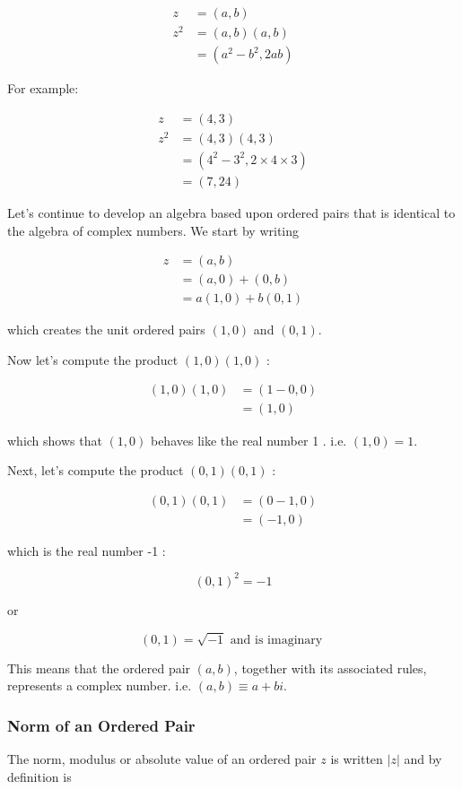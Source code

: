 \documentclass[10pt]{article}
\begin{document}
$$
\begin{aligned}
z & =(a, b) \\
z^{2} & =(a, b)(a, b) \\
& =\left(a^{2}-b^{2}, 2 a b\right)
\end{aligned}
$$

For example:

$$
\begin{aligned}
z & =(4,3) \\
z^{2} & =(4,3)(4,3) \\
& =\left(4^{2}-3^{2}, 2 \times 4 \times 3\right) \\
& =(7,24)
\end{aligned}
$$

Let's continue to develop an algebra based upon ordered pairs that is identical to the algebra of complex numbers. We start by writing

$$
\begin{aligned}
z & =(a, b) \\
& =(a, 0)+(0, b) \\
& =a(1,0)+b(0,1)
\end{aligned}
$$

which creates the unit ordered pairs $(1,0)$ and $(0,1)$.

Now let's compute the product $(1,0)(1,0)$ :

$$
\begin{aligned}
(1,0)(1,0) & =(1-0,0) \\
& =(1,0)
\end{aligned}
$$

which shows that $(1,0)$ behaves like the real number 1 . i.e. $(1,0)=1$.

Next, let's compute the product $(0,1)(0,1)$ :

$$
\begin{aligned}
(0,1)(0,1) & =(0-1,0) \\
& =(-1,0)
\end{aligned}
$$

which is the real number -1 :

$$
(0,1)^{2}=-1
$$

or

$$
(0,1)=\sqrt{-1} \text { and is imaginary }
$$

This means that the ordered pair $(a, b)$, together with its associated rules, represents a complex number. i.e. $(a, b) \equiv a+b i$.

\subsubsection{Norm of an Ordered Pair}
The norm, modulus or absolute value of an ordered pair $z$ is written $|z|$ and by definition is
\end{document}
